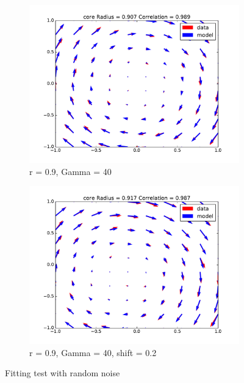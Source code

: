 \documentclass[12pt, a4paper, openany]{memoir}
\begin{document}
\begin{figure}[h!]
\begin{subfigure}[b]{0.45\textwidth}
		\includegraphics[trim=40 20 40 20 ,clip, width=\textwidth]{figure/test_09_40N.pdf}
		\caption{r = 0.9, Gamma = 40}
	\end{subfigure}
	\begin{subfigure}[b]{0.45\textwidth}
		\centering
		\includegraphics[trim=40 20 40 20 ,clip, width=\textwidth]{figure/test_09_40_02N.pdf}
		\caption{r = 0.9, Gamma = 40, shift = 0.2}
	\end{subfigure}
	\caption{Fitting test with random noise}
	\label{fig:fittingtestsnoise}
\end{figure}
\end{document}
